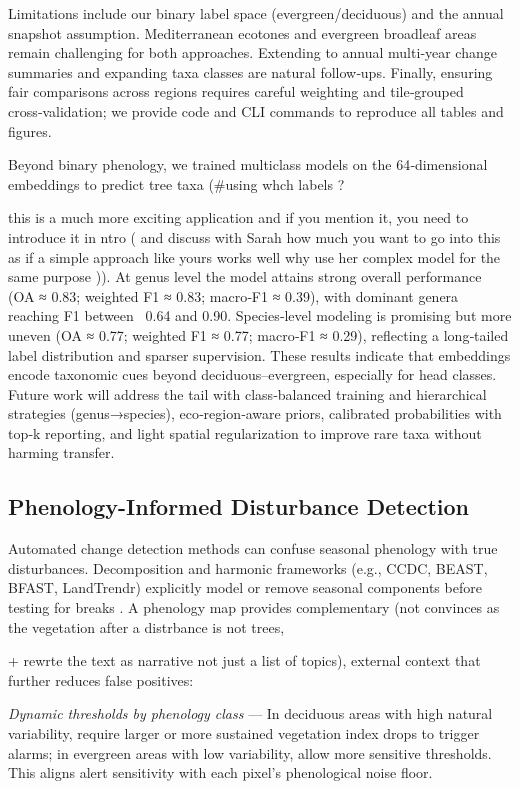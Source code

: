 \documentclass[utf8]{FrontiersinHarvard}
\begin{document}
Limitations include our binary label space (evergreen/deciduous) and the annual snapshot assumption. Mediterranean ecotones and evergreen broadleaf areas remain challenging for both approaches. Extending to annual multi‑year change summaries and expanding taxa classes are natural follow‑ups. Finally, ensuring fair comparisons across regions requires careful weighting and tile‑grouped cross‑validation; we provide code and CLI commands to reproduce all tables and figures.

Beyond binary phenology, we trained multiclass models on the 64‑dimensional embeddings to predict tree taxa (#using whch labels ? 

this is a much more exciting application and if you mention it, you need to introduce it in ntro ( and discuss with Sarah how much you want to go into this as if a simple approach like yours works well why use her complex model for the same purpose )). At genus level the model attains strong overall performance (OA ≈ 0.83; weighted F1 ≈ 0.83; macro‑F1 ≈ 0.39), with dominant genera reaching F1 between ~0.64 and 0.90. Species‑level modeling is promising but more uneven (OA ≈ 0.77; weighted F1 ≈ 0.77; macro‑F1 ≈ 0.29), reflecting a long‑tailed label distribution and sparser supervision. These results indicate that embeddings encode taxonomic cues beyond deciduous–evergreen, especially for head classes. Future work will address the tail with class‑balanced training and hierarchical strategies (genus→species), eco‑region‑aware priors, calibrated probabilities with top‑k reporting, and light spatial regularization to improve rare taxa without harming transfer.

\subsection{Phenology-Informed Disturbance Detection}
Automated change detection methods can confuse seasonal phenology with true disturbances. Decomposition and harmonic frameworks (e.g., CCDC, BEAST, BFAST, LandTrendr) explicitly model or remove seasonal components before testing for breaks \citep{Zhu2014,Zhao2019,Verbesselt2010a,Verbesselt2010b,Kennedy2010,Kennedy2018}. A phenology map provides complementary (not convinces as the vegetation after a distrbance is not trees, 

+ rewrte the text as narrative not just a list of topics), external context that further reduces false positives:

\textit{Dynamic thresholds by phenology class} — In deciduous areas with high natural variability, require larger or more sustained vegetation index drops to trigger alarms; in evergreen areas with low variability, allow more sensitive thresholds. This aligns alert sensitivity with each pixel’s phenological noise floor.
\end{document}
